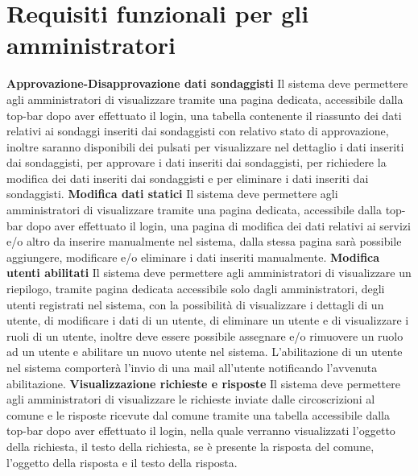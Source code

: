     \section{Requisiti funzionali per gli amministratori}
        \begin{rfList}
            \rfItem \textbf{Approvazione-Disapprovazione dati sondaggisti } Il sistema deve permettere agli amministratori di visualizzare tramite una pagina dedicata, accessibile dalla top-bar dopo aver effettuato il login, una tabella contenente il riassunto dei dati relativi ai sondaggi inseriti dai sondaggisti con relativo stato di approvazione, inoltre saranno disponibili dei pulsati per visualizzare nel dettaglio i dati inseriti dai sondaggisti, per approvare i dati inseriti dai sondaggisti, per richiedere la modifica dei dati inseriti dai sondaggisti e per eliminare i dati inseriti dai sondaggisti.
            \rfItem \textbf{Modifica dati statici} Il sistema deve permettere agli amministratori di visualizzare tramite una pagina dedicata, accessibile dalla top-bar dopo aver effettuato il login, una pagina di modifica dei dati relativi ai servizi e/o altro da inserire manualmente nel sistema, dalla stessa pagina sarà possibile aggiungere, modificare e/o eliminare i dati inseriti manualmente.
            \rfItem \textbf{Modifica utenti abilitati} Il sistema deve permettere agli amministratori di visualizzare un riepilogo, tramite pagina dedicata accessibile solo dagli amministratori, degli utenti registrati nel sistema, con la possibilità di visualizzare i dettagli di un utente, di modificare i dati di un utente, di eliminare un utente e di visualizzare i ruoli di un utente, inoltre deve essere possibile assegnare e/o rimuovere un ruolo ad un utente e abilitare un nuovo utente nel sistema. L'abilitazione di un utente nel sistema comporterà l'invio di una mail all'utente notificando l'avvenuta abilitazione.
            \rfItem \textbf{Visualizzazione richieste e risposte} Il sistema deve permettere agli amministratori di visualizzare le richieste inviate dalle circoscrizioni al comune e le risposte ricevute dal comune tramite una tabella accessibile dalla top-bar dopo aver effettuato il login, nella quale verranno visualizzati l'oggetto della richiesta, il testo della richiesta, se è presente la risposta del comune, l'oggetto della risposta e il testo della risposta.
        \end{rfList}
